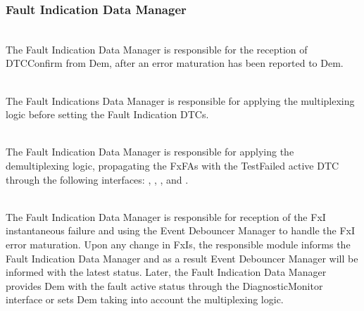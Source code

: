 {}

\subsubsection{Fault Indication Data Manager}

\\
The Fault Indication Data Manager is responsible for the reception of DTCConfirm from Dem, after an error maturation has been reported to Dem.
\\
{   }

\\
The Fault Indications Data Manager is responsible for applying the multiplexing logic before setting the Fault Indication DTCs. 
\\
{   }


\\
The Fault Indication Data Manager is responsible for applying the demultiplexing logic, propagating the FxFAs with the TestFailed active DTC through the following interfaces:
, , ,  and .
\\
{
        
       
     
}

\\
The Fault Indication Data Manager is responsible for reception of the FxI instantaneous failure and
using the Event Debouncer Manager to handle the FxI error maturation. 
Upon any change in FxIs, the responsible module informs the Fault Indication Data Manager and as a result
Event Debouncer Manager will be informed with the latest status.
Later, the Fault Indication Data Manager provides Dem with the fault active status through the 
DiagnosticMonitor interface or sets Dem taking into account the multiplexing logic.
\\
{       
      
}

